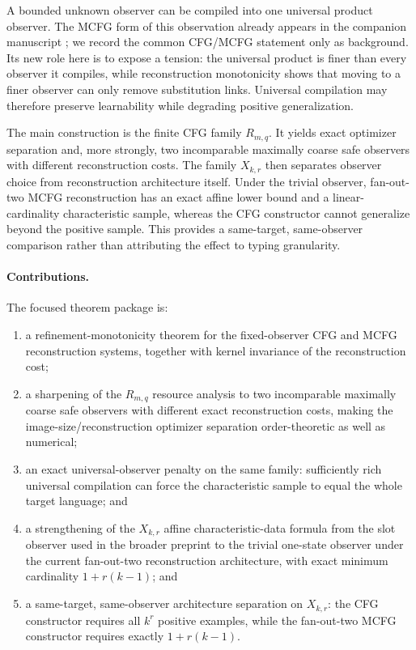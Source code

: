 \documentclass[11pt]{article}
\theoremstyle{definition}
\theoremstyle{remark}
\begin{document}
A bounded unknown observer can be compiled into one universal product observer.
The MCFG form of this observation already appears in the companion manuscript
\cite{KuriyamaMCFG}; we record the common CFG/MCFG statement only as
background.  Its new role here is to expose a tension: the universal product is
finer than every observer it compiles, while reconstruction monotonicity shows
that moving to a finer observer can only remove substitution links.  Universal
compilation may therefore preserve learnability while degrading positive
generalization.

The main construction is the finite CFG family \(R_{m,q}\).  It yields exact
optimizer separation and, more strongly, two incomparable maximally coarse
safe observers with different reconstruction costs.  The family \(X_{k,r}\)
then separates observer choice from reconstruction architecture itself.  Under
the trivial observer, fan-out-two MCFG reconstruction has an exact affine
lower bound and a linear-cardinality characteristic sample, whereas the CFG
constructor cannot generalize beyond the positive sample.  This provides a
same-target, same-observer comparison rather than attributing the effect to
typing granularity.

\paragraph{Contributions.}
The focused theorem package is:
\begin{enumerate}[label=(\roman*),leftmargin=*]
\item a refinement-monotonicity theorem for the fixed-observer CFG and MCFG
      reconstruction systems, together with kernel invariance of the
      reconstruction cost;
\item a sharpening of the \(R_{m,q}\) resource analysis to two incomparable
      maximally coarse safe observers with different exact reconstruction
      costs, making the image-size/reconstruction optimizer separation
      order-theoretic as well as numerical;
\item an exact universal-observer penalty on the same family: sufficiently rich
      universal compilation can force the characteristic sample to equal the
      whole target language; and
\item a strengthening of the \(X_{k,r}\) affine characteristic-data formula
      from the slot observer used in the broader preprint to the trivial
      one-state observer under the current fan-out-two reconstruction
      architecture, with exact minimum cardinality \(1+r(k-1)\); and
\item a same-target, same-observer architecture separation on \(X_{k,r}\):
      the CFG constructor requires all \(k^r\) positive examples, while the
      fan-out-two MCFG constructor requires exactly \(1+r(k-1)\).
\end{enumerate}
\end{document}
